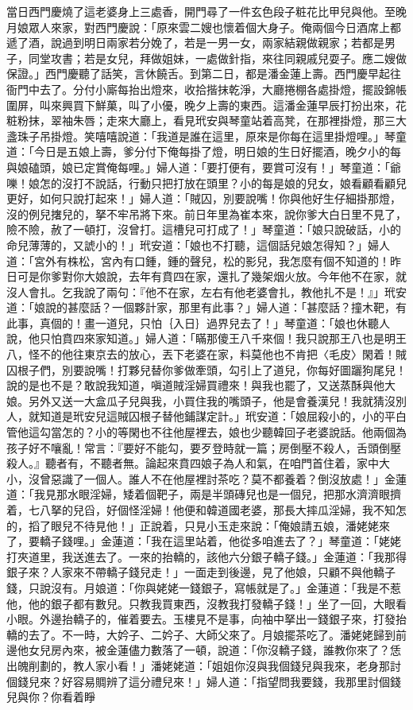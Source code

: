 \begin{showcontents}{}
當日西門慶燒了這老婆身上三處香，開門尋了一件玄色段子粧花比甲兒與他。至晚月娘眾人來家，對西門慶說：「原來雲二嫂也懷着個大身子。俺兩個今日酒席上都遞了酒，說過到明日兩家若分娩了，若是一男一女，兩家結親做親家；若都是男子，同堂攻書；若是女兒，拜做姐妹，一處做針指，來往同親戚兒耍子。應二嫂做保證。」西門慶聽了話笑，言休饒舌。到第二日，都是潘金蓮上壽。西門慶早起往衙門中去了。分付小廝每抬出燈來，收拾揩抹乾淨，大廳捲棚各處掛燈，擺設錦帳圍屏，叫來興買下鮮菓，叫了小優，晚夕上壽的東西。這潘金蓮早辰打扮出來，花粧粉抹，翠袖朱唇；走來大廳上，看見玳安與琴童站着高凳，在那裡掛燈，那三大盞珠子吊掛燈。笑嘻嘻說道：「我道是誰在這里，原來是你每在這里掛燈哩。」琴童道：「今日是五娘上壽，爹分付下俺每掛了燈，明日娘的生日好擺酒，晚夕小的每與娘磕頭，娘已定賞俺每哩。」婦人道：「要打便有，要賞可沒有！」琴童道：「爺嚛！娘怎的沒打不說話，行動只把打放在頭里？小的每是娘的兒女，娘看顧看顧兒更好，如何只說打起來！」婦人道：「賊囚，別要說嘴！你與他好生仔細掛那燈，沒的例兒撦兒的，拏不牢吊將下來。前日年里為崔本來，說你爹大白日里不見了，險不險，赦了一頓打，沒曾打。這槽兒可打成了！」琴童道：「娘只說破話，小的命兒薄薄的，又諕小的！」玳安道：「娘也不打聽，這個話兒娘怎得知？」婦人道：「宮外有株松，宮內有口鍾，鍾的聲兒，松的影兒，我怎麼有個不知道的！昨日可是你爹對你大娘說，去年有賁四在家，還扎了幾架烟火放。今年他不在家，就沒人會扎。乞我說了兩句：『他不在家，左右有他老婆會扎，教他扎不是！』」玳安道：「娘說的甚麼話？一個夥計家，那里有此事？」婦人道：「甚麼話？撞木靶，有此事，真個的！畫一道兒，只怕｛入日｝過界兒去了！」琴童道：「娘也休聽人說，他只怕賁四來家知道。」婦人道：「瞞那傻王八千來個！我只說那王八也是明王八，怪不的他往東京去的放心，丟下老婆在家，料莫他也不肯把〈毛皮〉閑着！賊囚根子們，別要說嘴！打夥兒替你爹做牽頭，勾引上了道兒，你每好圖躧狗尾兒！說的是也不是？敢說我知道，嗔道賊淫婦買禮來！與我也罷了，又送蒸酥與他大娘。另外又送一大盒瓜子兒與我，小買住我的嘴頭子，他是會養漢兒！我就猜沒別人，就知道是玳安兒這賊囚根子替他鋪謀定計。」玳安道：「娘屈殺小的，小的平白管他這勾當怎的？小的等閑也不往他屋裡去，娘也少聽韓回子老婆說話。他兩個為孩子好不嚷亂！常言：『要好不能勾，要歹登時就一篇；房倒壓不殺人，舌頭倒壓殺人。』聽者有，不聽者無。論起來賁四娘子為人和氣，在咱門首住着，家中大小，沒曾惡識了一個人。誰人不在他屋裡討茶吃？莫不都養着？倒沒放處！」金蓮道：「我見那水眼淫婦，矮着個靶子，兩是半頭磚兒也是一個兒，把那水濟濟眼擠着，七八拏的兒舀，好個怪淫婦！他便和韓道國老婆，那長大摔瓜淫婦，我不知怎的，搯了眼兒不待見他！」正說着，只見小玉走來說：「俺娘請五娘，潘姥姥來了，要轎子錢哩。」金蓮道：「我在這里站着，他從多咱進去了？」琴童道：「姥姥打夾道里，我送進去了。一來的抬轎的，該他六分銀子轎子錢。」金蓮道：「我那得銀子來？人家來不帶轎子錢兒走！」一面走到後邊，見了他娘，只顧不與他轎子錢，只說沒有。月娘道：「你與姥姥一錢銀子，寫帳就是了。」金蓮道：「我是不惹他，他的銀子都有數兒。只教我買東西，沒教我打發轎子錢！」坐了一回，大眼看小眼。外邊抬轎子的，催着要去。玉樓見不是事，向袖中拏出一錢銀子來，打發抬轎的去了。不一時，大妗子、二妗子、大師父來了。月娘擺茶吃了。潘姥姥歸到前邊他女兒房內來，被金蓮儘力數落了一頓，說道：「你沒轎子錢，誰教你來了？恁出魄削劃的，教人家小看！」潘姥姥道：「姐姐你沒與我個錢兒與我來，老身那討個錢兒來？好容易賙辨了這分禮兒來！」婦人道：「指望問我要錢，我那里討個錢兒與你？你看着睜
\end{showcontents}
